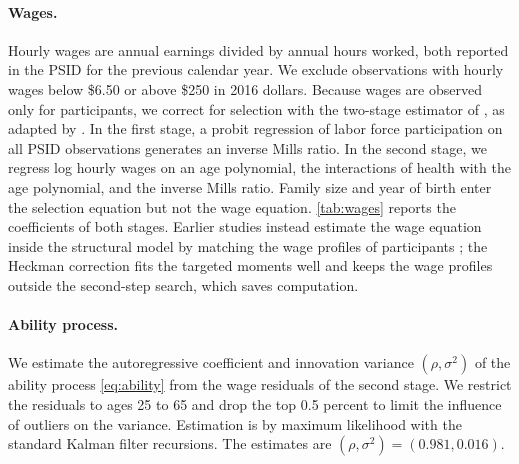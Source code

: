 \paragraph{Wages.} Hourly wages are annual earnings divided by annual hours worked, both reported in the PSID for the previous calendar year. We exclude observations with hourly wages below \$6.50 or above \$250 in 2016 dollars. %
Because wages are observed only for participants, we correct for selection with the two-stage estimator of \citet{Heckman1976}, as adapted by \citet{Guner2012}. In the first stage, a probit regression of labor force participation on all PSID observations generates an inverse Mills ratio. In the second stage, we regress log hourly wages on an age polynomial, the interactions of health with the age polynomial, and the inverse Mills ratio. Family size and year of birth enter the selection equation but not the wage equation. \autoref{tab:wages} reports the coefficients of both stages. Earlier studies instead estimate the wage equation inside the structural model by matching the wage profiles of participants \citep{french2005effects,french2011effects}; the Heckman correction fits the targeted moments well and keeps the wage profiles outside the second-step search, which saves computation.

\begin{table}[!htbp]
\centering
\caption{Estimated Coefficients of the Wage Equation with Selection}\label{tab:wages}
\small

\end{table}

\paragraph{Ability process.} We estimate the autoregressive coefficient and innovation variance $(\rho,\sigma^2)$ of the ability process \eqref{eq:ability} from the wage residuals of the second stage. We restrict the residuals to ages 25 to 65 and drop the top 0.5 percent to limit the influence of outliers on the variance. %
Estimation is by maximum likelihood with the standard Kalman filter recursions. The estimates are $(\rho,\sigma^2)=(0.981,0.016)$.

